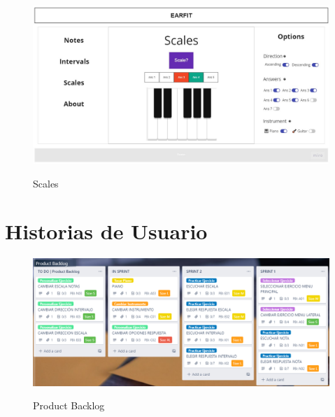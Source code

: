 \documentclass[12pt,twoside,titlepage]{report}
\begin{document}
{\begin{figure}[H]
    \centering
    \includegraphics[scale=0.3]{Design Thinking/Prototipo/Large/Scales}
    \label{fig:ScalesLarge}
    \caption{Scales}
\end{figure}


\chapter{Historias de Usuario}

\begin{figure}[H]
    \centering
    \includegraphics[scale=0.73]{Scrum/User Stories/ProductBacklog}
    \label{fig:ProductBacklog}
    \caption{Product Backlog}
\end{figure}

}
\end{document}
